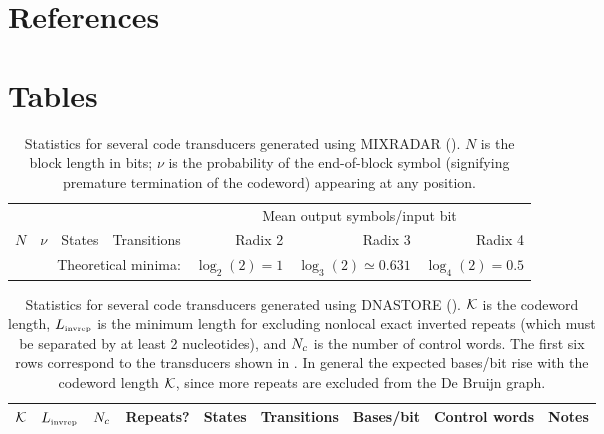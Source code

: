 \documentclass[english]{article}
\begin{document}

\newpage
\section{References}


\newpage
\section{Tables}

\newpage
\begin{table}[h!t]
\begin{tabular}{rrrrrrr}
& & & & \multicolumn{3}{c}{Mean output symbols/input bit} \\
\cline{5-7}
$N$ & $\nu$ & States & Transitions & Radix 2 & Radix 3 & Radix 4 \\
\hline

\hline
\multicolumn{4}{r}{Theoretical minima:} & $\log_2(2) = 1$ & $\log_3(2) \simeq 0.631$ & $\log_4(2) = 0.5$
\end{tabular}
\caption{
  Statistics for several code transducers generated using MIXRADAR ().
$N$ is the block length in bits; $\nu$ is the probability of the end-of-block symbol
(signifying premature termination of the codeword) appearing at any position.
}
\end{table}

\newpage
\begin{table}[h!t]
  \begin{tabular}{rrrrrrrll}
    ${\cal K}$ & $L_{\mbox{\tiny invrep}}$ & $N_c$ & Repeats? & States & Transitions & Bases/bit & Control words & Notes \\
    \hline

\end{tabular}
\caption{
  Statistics for several code transducers generated using DNASTORE ().
  ${\cal K}$ is the codeword length,
  $L_{\mbox{\tiny invrep}}$ is the minimum length for excluding nonlocal exact inverted repeats
  (which must be separated by at least 2 nucleotides),
  and $N_c$ is the number of control words.
  The first six rows correspond to the transducers shown in .
  In general the expected bases/bit rise with the codeword length ${\cal K}$,
  since more repeats are excluded from the De Bruijn graph.
}
\end{table}
\end{document}
